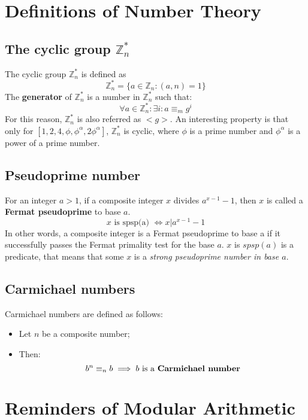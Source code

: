 \section{Definitions of Number Theory}
\subsection{The cyclic group $\mathbb{Z}_{n}^{*}$}
The cyclic group $\mathbb{Z}_{n}^{*}$ is defined as
\[
\mathbb{Z}_{n}^{*} = \{a \in \mathbb{Z}_{n}: (a,n) = 1\}
\]
The \textbf{generator} of $\mathbb{Z}_{n}^{*}$ is a number in $\mathbb{Z}_{n}^{*}$ such that:
\[
\forall a \in \mathbb{Z}_{n}^{*}: \exists i: a \equiv_{m} g^{i}
\]
For this reason, $\mathbb{Z}_{n}^{*}$ is also referred as $< g >$.\newline
An interesting property is that only for $[1,2,4, \phi, \phi^{\alpha}, 2 \phi^{\alpha}]$,
 $\mathbb{Z}_{n}^{*}$ is cyclic, where $\phi$ is a prime number and $\phi^{\alpha}$ is a power of a prime number.\newline

\subsection{Pseudoprime number}
For an integer $a > 1$, if a composite integer $x$ divides $a^{x-1} - 1$, then $x$ is called a \textbf{Fermat pseudoprime} to base $a$.
\[
x \text{ is spsp(a) } \iff x|a^{x - 1} - 1
\]
In other words, a composite integer is a Fermat pseudoprime to base a if it successfully passes the Fermat primality test for the base $a$.\newline
$x$ is $spsp(a)$ is a predicate, that means that some $x$ is a \emph{strong pseudoprime number in base $a$}.

\subsection{Carmichael numbers}
Carmichael numbers are defined as follows:
\begin{itemize}
    \item Let $n$ be a composite number;
    \item Then:
    \[b^{n} \equiv_{n} b \implies b \text{ is a \textbf{Carmichael number}}\]
\end{itemize}

\section{Reminders of Modular Arithmetic}

